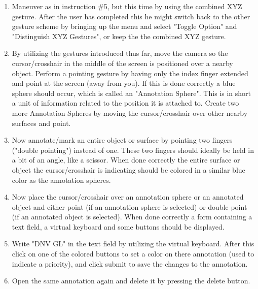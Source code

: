 \begin{enumerate}
    \item Maneuver as in instruction \#5, but this time by using the combined XYZ gesture. After the user has completed this he might switch back to the other gesture scheme
          by bringing up the menu and select "Toggle Option" and "Distinguish XYZ Gestures", or keep the the combined XYZ gesture.

    \item By utilizing the gestures introduced thus far, move the camera so the cursor/crosshair in the middle of the screen is positioned over a nearby object. 
          Perform a pointing gesture by having only the index finger extended and point at the screen (away from you). If this is done correctly a blue sphere should occur, which
          is called an "Annotation Sphere". This is in short a unit of information related to the position it is attached to. Create two more Annotation Spheres by moving the 
          cursor/crosshair over other nearby surfaces and point. 
    
    \item Now annotate/mark an entire object or surface by pointing two fingers ("double pointing") instead of one. These two fingers should ideally be held in a bit of an angle, like a scissor. 
          When done correctly the entire surface or object the cursor/crosshair is indicating should be colored in a similar blue color as the annotation spheres. 

    \item Now place the cursor/crosshair over an annotation sphere or an annotated object and either point (if an annotation sphere is selected) or double point (if an annotated
          object is selected). When done correctly a form containing a text field, a virtual keyboard and some buttons should be displayed. 

    \item Write "DNV GL" in the text field by utilizing the virtual keyboard. After this click on one of the colored buttons to set a color on there annotation (used to indicate a 
          priority), and click submit to save the changes to the annotation. 

    \item Open the same annotation again and delete it by pressing the delete button.     
\end{enumerate}

